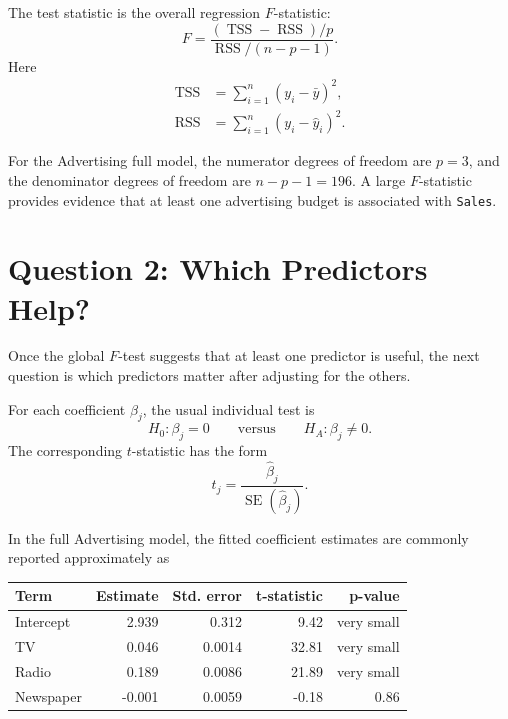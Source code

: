 The test statistic is the overall regression \(F\)-statistic:
\begin{equation}
  F=\frac{(\operatorname{TSS}-\operatorname{RSS})/p}{\operatorname{RSS}/(n-p-1)}.
\end{equation}
Here
\begin{align}
  \operatorname{TSS} &= \sum_{i=1}^n (y_i-\bar{y})^2,\\
  \operatorname{RSS} &= \sum_{i=1}^n (y_i-\widehat{y}_i)^2.
\end{align}

For the Advertising full model, the numerator degrees of freedom are \(p=3\), and the denominator degrees of freedom are \(n-p-1=196\).  A large \(F\)-statistic provides evidence that at least one advertising budget is associated with \texttt{Sales}.

\section{Question 2: Which Predictors Help?}

Once the global \(F\)-test suggests that at least one predictor is useful, the next question is which predictors matter after adjusting for the others.

For each coefficient \(\beta_j\), the usual individual test is
\begin{equation}
  H_0:\beta_j=0
  \qquad\text{versus}\qquad
  H_A:\beta_j\neq 0.
\end{equation}
The corresponding \(t\)-statistic has the form
\begin{equation}
  t_j=\frac{\widehat{\beta}_j}{\operatorname{SE}(\widehat{\beta}_j)}.
\end{equation}

In the full Advertising model, the fitted coefficient estimates are commonly reported approximately as
\begin{center}
\begin{tabular}{lrrrr}
\toprule
\textbf{Term} & \textbf{Estimate} & \textbf{Std. error} & \textbf{t-statistic} & \textbf{p-value}\\
\midrule
Intercept & 2.939 & 0.312 & 9.42 & very small\\
TV & 0.046 & 0.0014 & 32.81 & very small\\
Radio & 0.189 & 0.0086 & 21.89 & very small\\
Newspaper & -0.001 & 0.0059 & -0.18 & 0.86\\
\bottomrule
\end{tabular}
\end{center}

